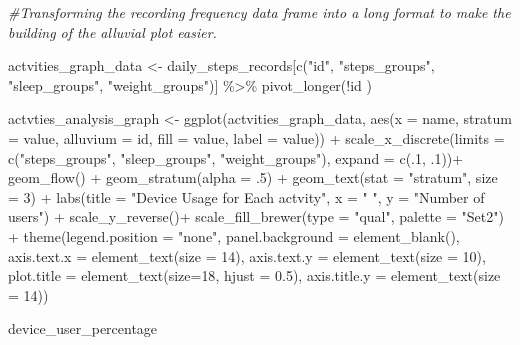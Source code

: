 \documentclass[
]{article}
\newenvironment{Shaded}{\begin{snugshade}}{\end{snugshade}}
\newcommand{\AttributeTok}[1]{\textcolor[rgb]{0.77,0.63,0.00}{#1}}
\newcommand{\CommentTok}[1]{\textcolor[rgb]{0.56,0.35,0.01}{\textit{#1}}}
\newcommand{\DecValTok}[1]{\textcolor[rgb]{0.00,0.00,0.81}{#1}}
\newcommand{\FloatTok}[1]{\textcolor[rgb]{0.00,0.00,0.81}{#1}}
\newcommand{\FunctionTok}[1]{\textcolor[rgb]{0.00,0.00,0.00}{#1}}
\newcommand{\NormalTok}[1]{#1}
\newcommand{\OtherTok}[1]{\textcolor[rgb]{0.56,0.35,0.01}{#1}}
\newcommand{\SpecialCharTok}[1]{\textcolor[rgb]{0.00,0.00,0.00}{#1}}
\newcommand{\StringTok}[1]{\textcolor[rgb]{0.31,0.60,0.02}{#1}}
\begin{document}
\begin{Shaded}
\begin{Highlighting}[]
\CommentTok{\#Transforming the recording frequency data frame into a long format to make the building of the alluvial plot easier.}

\NormalTok{actvities\_graph\_data  }\OtherTok{\textless{}{-}}\NormalTok{ daily\_steps\_records[}\FunctionTok{c}\NormalTok{(}\StringTok{"id"}\NormalTok{, }\StringTok{"steps\_groups"}\NormalTok{, }\StringTok{"sleep\_groups"}\NormalTok{, }\StringTok{"weight\_groups"}\NormalTok{)] }\SpecialCharTok{\%\textgreater{}\%}
  \FunctionTok{pivot\_longer}\NormalTok{(}\SpecialCharTok{!}\NormalTok{id )}

  

\NormalTok{actvties\_analysis\_graph  }\OtherTok{\textless{}{-}} 
    \FunctionTok{ggplot}\NormalTok{(actvities\_graph\_data, }\FunctionTok{aes}\NormalTok{(}\AttributeTok{x =}\NormalTok{ name, }\AttributeTok{stratum =}\NormalTok{ value, }\AttributeTok{alluvium =}\NormalTok{ id, }\AttributeTok{fill =}\NormalTok{ value, }\AttributeTok{label =}\NormalTok{ value)) }\SpecialCharTok{+}
    \FunctionTok{scale\_x\_discrete}\NormalTok{(}\AttributeTok{limits =} \FunctionTok{c}\NormalTok{(}\StringTok{"steps\_groups"}\NormalTok{, }\StringTok{"sleep\_groups"}\NormalTok{, }\StringTok{"weight\_groups"}\NormalTok{), }\AttributeTok{expand =} \FunctionTok{c}\NormalTok{(.}\DecValTok{1}\NormalTok{, .}\DecValTok{1}\NormalTok{))}\SpecialCharTok{+}
    \FunctionTok{geom\_flow}\NormalTok{() }\SpecialCharTok{+}
    \FunctionTok{geom\_stratum}\NormalTok{(}\AttributeTok{alpha =}\NormalTok{ .}\DecValTok{5}\NormalTok{) }\SpecialCharTok{+}
    \FunctionTok{geom\_text}\NormalTok{(}\AttributeTok{stat =} \StringTok{"stratum"}\NormalTok{, }\AttributeTok{size =} \DecValTok{3}\NormalTok{) }\SpecialCharTok{+}
    \FunctionTok{labs}\NormalTok{(}\AttributeTok{title =} \StringTok{"Device Usage for Each actvity"}\NormalTok{, }\AttributeTok{x =} \StringTok{" "}\NormalTok{, }\AttributeTok{y =} \StringTok{"Number of users"}\NormalTok{) }\SpecialCharTok{+}
   \FunctionTok{scale\_y\_reverse}\NormalTok{()}\SpecialCharTok{+}
    \FunctionTok{scale\_fill\_brewer}\NormalTok{(}\AttributeTok{type =} \StringTok{"qual"}\NormalTok{, }\AttributeTok{palette =} \StringTok{"Set2"}\NormalTok{) }\SpecialCharTok{+}
    \FunctionTok{theme}\NormalTok{(}\AttributeTok{legend.position =} \StringTok{"none"}\NormalTok{, }
          \AttributeTok{panel.background =} \FunctionTok{element\_blank}\NormalTok{(),}
          \AttributeTok{axis.text.x =} \FunctionTok{element\_text}\NormalTok{(}\AttributeTok{size =} \DecValTok{14}\NormalTok{),}
          \AttributeTok{axis.text.y =} \FunctionTok{element\_text}\NormalTok{(}\AttributeTok{size =} \DecValTok{10}\NormalTok{),}
          \AttributeTok{plot.title =} \FunctionTok{element\_text}\NormalTok{(}\AttributeTok{size=}\DecValTok{18}\NormalTok{, }\AttributeTok{hjust =} \FloatTok{0.5}\NormalTok{), }
          \AttributeTok{axis.title.y =} \FunctionTok{element\_text}\NormalTok{(}\AttributeTok{size =} \DecValTok{14}\NormalTok{))}
 



\NormalTok{device\_user\_percentage}
\end{Highlighting}
\end{Shaded}
\end{document}
